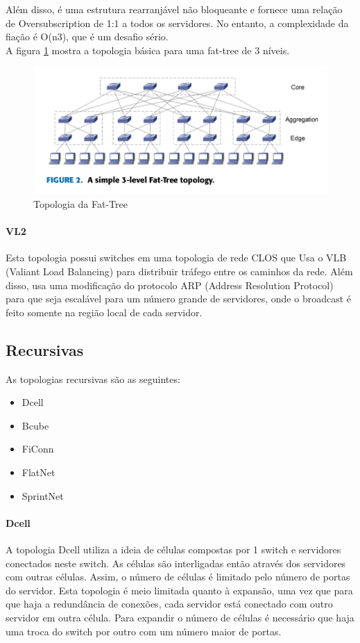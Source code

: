 \documentclass[12pt,a4paper]{report}
\begin{document}
Além disso, é uma estrutura rearranjável não bloqueante e fornece uma relação de Oversubscription de 1:1 a todos os servidores. No entanto, a complexidade da fiação é O(n3), que é um desafio sério.\\

A figura \ref{fat_tree} mostra a topologia básica para uma fat-tree de 3 níveis.\\

\begin{figure}[H]
\centering
\includegraphics[width=.8\textwidth]{imagens/fat_tree.png}
\caption{Topologia da Fat-Tree}
\label{fat_tree}
\end{figure}

\paragraph{VL2}
Esta topologia possui switches em uma topologia de rede CLOS que Usa o VLB (Valiant Load Balancing) para distribuir tráfego entre os caminhos da rede. Além disso, usa uma modificação do protocolo ARP (Address Resolution Protocol) para que seja escalável para um número grande de servidores, onde o broadcast é feito somente na região local de cada servidor.\\

\subsection{Recursivas}
As topologias recursivas são as seguintes:\\
\begin{itemize}
\item Dcell
\item Bcube
\item FiConn
\item FlatNet
\item SprintNet
\end{itemize}

\paragraph{Dcell}
A topologia Dcell utiliza a ideia de células compostas por 1 switch e servidores conectados neste switch. As células são interligadas então através dos servidores com outras células. Assim, o número de células é limitado pelo número de portas do servidor. Esta topologia é meio limitada quanto à expansão, uma vez que para que haja a redundância de conexões, cada servidor está conectado com outro servidor em outra célula. Para expandir o número de células é necessário que haja uma troca do switch por outro com um número maior de portas.\\
\end{document}
